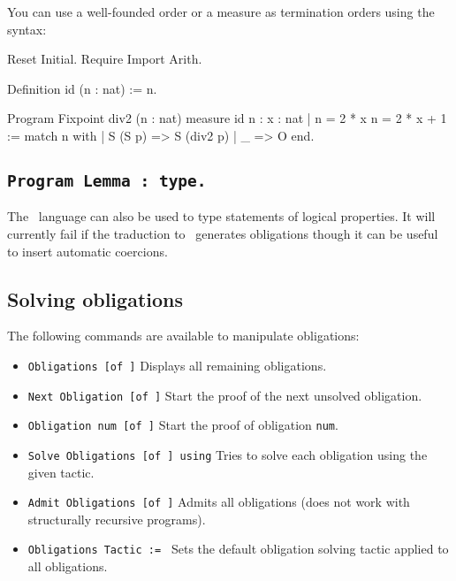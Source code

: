 You can use a well-founded order or a measure as termination orders using the syntax:
\begin{coq_eval}
Reset Initial.
Require Import Arith.
\end{coq_eval}
\begin{coq_example}
Definition id (n : nat) := n.

Program Fixpoint div2 (n : nat) {measure id n} : { x : nat | n = 2 * x \/ n = 2 * x + 1 } :=
  match n with
  | S (S p) => S (div2 p)
  | _ => O
  end.
\end{coq_example}

\subsection{\tt Program Lemma {\ident} : type.
  \label{ProgramLemma}}

The \Russell\ language can also be used to type statements of logical
properties. It will currently fail if the traduction to \Coq\
generates obligations though it can be useful to insert automatic coercions.

\subsection{Solving obligations}
The following commands are available to manipulate obligations:

\begin{itemize}
\item {\tt Obligations [of \ident]} Displays all remaining
  obligations.
\item {\tt Next Obligation [of \ident]} Start the proof of the next
  unsolved obligation.
\item {\tt Obligation num [of \ident]} Start the proof of
  obligation {\tt num}.
\item {\tt Solve Obligations [of \ident] using} {\tacexpr} Tries to solve
  each obligation using the given tactic.
\item {\tt Admit Obligations [of \ident]} Admits all
  obligations (does not work with structurally recursive programs).
\item {\tt Obligations Tactic := \expr} Sets the default obligation
  solving tactic applied to all obligations.
\end{itemize}
  


